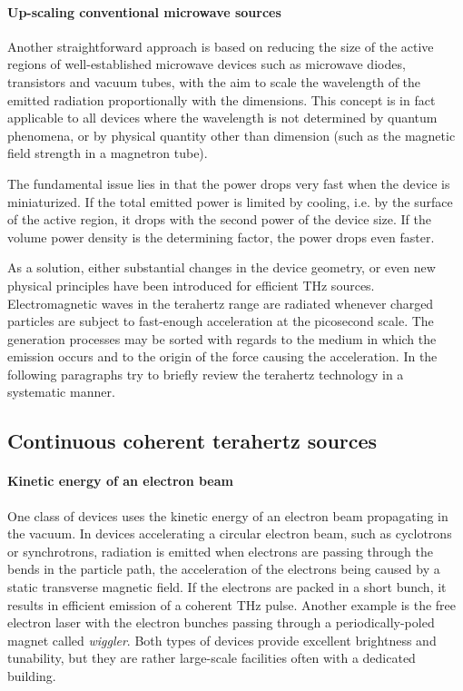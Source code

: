 \paragraph{Up-scaling conventional microwave sources}
Another straightforward approach is based on reducing the size of the active regions of well-established microwave devices such as microwave diodes, transistors and vacuum tubes, with the aim to scale the wavelength of the emitted radiation proportionally with the dimensions. 
This concept is in fact applicable to all %
 devices where the wavelength is not determined by quantum phenomena, or by physical quantity other than dimension (such as the magnetic field strength in a magnetron tube).

The fundamental issue lies in that the power drops very fast when the device is miniaturized. If the total emitted power is limited by cooling, i.e. by the surface of the active region, it drops with the second power of the device size. If the volume power density is the determining factor, the power drops even faster. 

As a solution, either substantial changes in the device geometry, or even new physical principles have been introduced for efficient THz sources. 
Electromagnetic waves in the terahertz range are radiated whenever charged particles are subject to fast-enough acceleration at the picosecond scale. 
The generation processes may be sorted with regards to the medium in which the emission occurs and to the origin of the force causing the acceleration.  %
In the following paragraphs try to briefly review the terahertz technology in a systematic manner.

\subsection{Continuous coherent terahertz sources}
\paragraph{Kinetic energy of an electron beam}
One class of devices uses the kinetic energy of an electron beam propagating in the vacuum. In devices accelerating a circular electron beam, such as cyclotrons or synchrotrons, radiation is emitted when electrons are passing through the bends in the particle path, the acceleration of the electrons being caused by a static transverse magnetic field. If the electrons are packed in a short bunch, it results in efficient emission of a coherent THz pulse. Another example is the free electron laser with the electron bunches %
passing through a periodically-poled magnet called \textit{wiggler}. 
Both types of devices provide excellent brightness and tunability, but they are rather large-scale facilities often with a dedicated building. 

